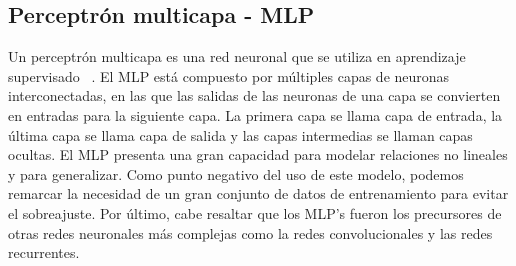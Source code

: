 \subsection{Perceptrón multicapa - MLP}
\label{subsubsec:eda_mlp}

Un perceptrón multicapa es una red neuronal que se utiliza en aprendizaje supervisado ~\cite{Popescu2009}. El MLP está compuesto por múltiples capas de neuronas interconectadas, en las que las salidas de las neuronas de una capa se convierten en entradas para la siguiente capa. La primera capa se llama capa de entrada, la última capa se llama capa de salida y las capas intermedias se llaman capas ocultas. El MLP presenta una gran capacidad para modelar relaciones no lineales y para generalizar. Como punto negativo del uso de este modelo, podemos remarcar la necesidad de un gran conjunto de datos de entrenamiento para evitar el sobreajuste. Por último, cabe resaltar que los MLP's fueron los precursores de otras redes neuronales más complejas como la redes convolucionales y las redes recurrentes. 
